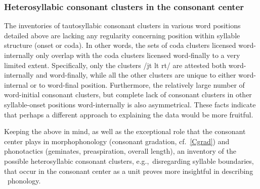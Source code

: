 \subsubsection[Heterosyllabic CCs in the consonant center]{Heterosyllabic consonant clusters in the consonant center}\label{consecutiveCs}
The inventories of tautosyllabic consonant clusters in various word positions detailed above are lacking any regularity concerning position within syllable structure (onset or coda). In other words, the sets of coda clusters licensed word-internally only overlap with the coda clusters licensed word-finally to a very limited extent. Specifically, only the clusters /jt lt rt/ are attested both word-internally and word-finally, while all the other clusters are unique to either word-internal or to word-final position. 
Furthermore, the relatively large number of word-initial consonant clusters, but complete lack of consonant clusters in other syllable-onset positions word-internally is also asymmetrical. 
These facts indicate that perhaps a different approach to explaining the data would be more fruitful. 

Keeping the above in mind, as well as the exceptional role that the consonant center plays in morphophonology (consonant gradation, cf.~\SEC\ref{Cgrad}) and phonotactics (geminates, preaspiration, overall length), an inventory of the possible heterosyllabic consonant clusters, e.g.,~disregarding syllable boundaries, that occur in the consonant center as a unit proves more insightful in describing \PS\ phonology. 

